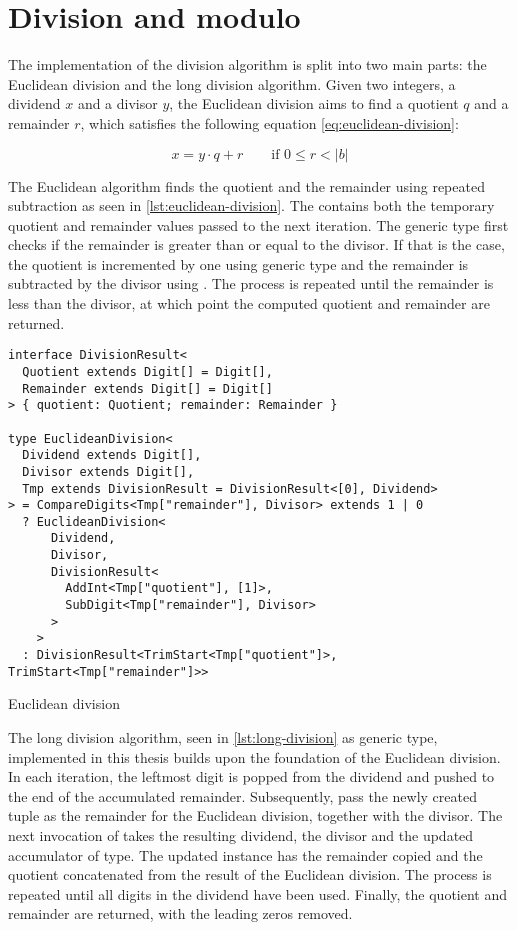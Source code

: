 \section{Division and modulo}

The implementation of the division algorithm is split into two main parts: the Euclidean division and the long division algorithm. Given two integers, a dividend $x$ and a divisor $y$, the Euclidean division aims to find a quotient $q$ and a remainder $r$, which satisfies the following equation \ref{eq:euclidean-division}:

\begin{equation}\label{eq:euclidean-division}
  x = y\cdot q + r \qquad \text{if } 0 \le r < |b|
\end{equation}

The Euclidean algorithm finds the quotient and the remainder using repeated subtraction as seen in \ref{lst:euclidean-division}. The  contains both the temporary quotient and remainder values passed to the next iteration. The  generic type first checks if the remainder is greater than or equal to the divisor. If that is the case, the quotient is incremented by one using  generic type and the remainder is subtracted by the divisor using . The process is repeated until the remainder is less than the divisor, at which point the computed quotient and remainder are returned.

\begin{listing}[ht]
  \begin{verbatim}
interface DivisionResult<
  Quotient extends Digit[] = Digit[],
  Remainder extends Digit[] = Digit[]
> { quotient: Quotient; remainder: Remainder }

type EuclideanDivision<
  Dividend extends Digit[],
  Divisor extends Digit[],
  Tmp extends DivisionResult = DivisionResult<[0], Dividend>
> = CompareDigits<Tmp["remainder"], Divisor> extends 1 | 0
  ? EuclideanDivision<
      Dividend,
      Divisor,
      DivisionResult<
        AddInt<Tmp["quotient"], [1]>,
        SubDigit<Tmp["remainder"], Divisor>
      >
    >
  : DivisionResult<TrimStart<Tmp["quotient"]>, TrimStart<Tmp["remainder"]>>
\end{verbatim}
  \caption{Euclidean division}\label{lst:euclidean-division}
\end{listing}

The long division algorithm, seen in \ref{lst:long-division} as  generic type, implemented in this thesis builds upon the foundation of the Euclidean division. In each iteration, the leftmost digit is popped from the dividend and pushed to the end of the accumulated remainder. Subsequently, pass the newly created tuple as the remainder for the Euclidean division, together with the divisor. The next invocation of  takes the resulting dividend, the divisor and the updated accumulator of  type. The updated  instance has the remainder copied and the quotient concatenated from the result of the Euclidean division. The process is repeated until all digits in the dividend have been used. Finally, the quotient and remainder are returned, with the leading zeros removed.

